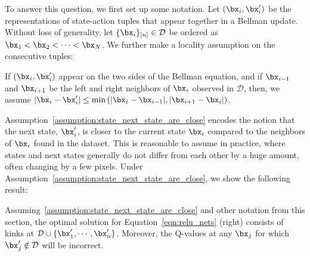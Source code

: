 To answer this question, we first set up some notation. Let $(\bx_i, \bx'_i)$ be the representations of state-action tuples that appear together in a Bellman update.
Without loss of generality, let $\{\bx_i\}_{[n]} \in \mathcal{D}$ be ordered as $\bx_1 < \bx_2 < \cdots < \bx_N$. We further make a locality assumption on the consecutive tuples:
\begin{assumption}
\label{assumption:state_next_state_are_close}
If $(\bx_i, \bx'_i)$ appear on the two sides of the Bellman equation, and if $\bx_{i-1}$ and $\bx_{i+1}$ be the left and right neighbors of $\bx_i$ observed in $\mathcal{D}$, then, we assume $|\bx_i - \bx'_i| \leq \min \left(|\bx_i - \bx_{i-1}|, |\bx_{i+1} - \bx_i| \right)$. 
\end{assumption}
Assumption~\ref{assumption:state_next_state_are_close} encodes the notion that the next state,
$\bx'_i$, is closer to the current state $\bx_i$ compared to the neighbors of $\bx_i$ found in the dataset. This is reasonable to assume in practice, where states and next states generally do not differ from each other by a huge amount, often changing by a few pixels.
Under Assumption~\ref{assumption:state_next_state_are_close}, we show the following result:
\begin{theorem}
\label{thm:relu_nets_kinks}
Assuming~\ref{assumption:state_next_state_are_close} and other notation from this section, the optimal solution for Equation~\ref{eqn:relu_nets} (right) consists of kinks
at $\mathcal{D} \cup \{\bx'_1, \cdots, \bx'_n\}$. Moreover, the Q-values at any $\bx_j$ for which $\bx'_j \notin \mathcal{D}$ will be incorrect.
\end{theorem}
